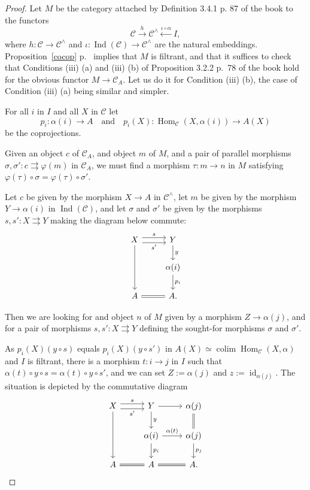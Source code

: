 \documentclass[12pt]{article}%
\theoremstyle{remark}
\theoremstyle{definition}
\newcommand{\C}{\mathcal C}
\newcommand{\pp}{\varphi}
\newcommand{\parar}{\rightrightarrows}
\DeclareMathOperator*{\colim}{colim}%
\DeclareMathOperator{\id}{id}
\DeclareMathOperator{\Hom}{Hom}%
\DeclareMathOperator{\Ind}{Ind}
\begin{document}
\begin{proof}
Let $M$ be the category attached by Definition 3.4.1 p. 87 of the book to the functors 
$$
\C\xrightarrow h\C^\wedge\xleftarrow{\iota\circ\alpha}I,
$$ 
where $h:\C\to\C^\wedge$ and $\iota:\Ind(\C)\to\C^\wedge$ are the natural embeddings. Proposition~\ref{cocop} p.~\pageref{cocop} implies that $M$ is filtrant, and that it suffices to check that Conditions (iii) (a) and (iii) (b) of Proposition 3.2.2 p.~78 of the book hold for the obvious functor $M\to\C_A$. Let us do it for Condition (iii) (b), the case of Condition (iii) (a) being similar and simpler. 

For all $i$ in $I$ and all $X$ in $\C$ let 
$$
p_i:\alpha(i)\to A\quad\text{and}\quad p_i(X):\Hom_\C(X,\alpha(i))\to A(X)
$$
be the coprojections.

Given an object $c$ of $\C_A$, and object $m$ of $M$, and a pair of parallel morphisms $\sigma,\sigma':c\parar\pp(m)$ in $\C_A$, we must find a morphism $\tau:m\to n$ in $M$ satisfying $\pp(\tau)\circ\sigma=\pp(\tau)\circ\sigma'$. 

Let $c$ be given by the morphism $X\to A$ in $\C^\wedge$, let $m$ be given by the morphism $Y\to\alpha(i)$ in $\Ind(\C)$, and let $\sigma$ and $\sigma'$ be given by the morphisms $s,s':X\parar Y$ making the diagram below commute:
$$
\begin{tikzcd}
X\ar{dd}\ar[yshift=0.7ex]{r}{s}\ar[yshift=-0.7ex]{r}[swap]{s'}&Y\ar{d}{y}\\ 
{}&\alpha(i)\ar{d}{p_i}\\ 
A\ar[equal]{r}&A.
\end{tikzcd}
$$ 

Then we are looking for and object $n$ of $M$ given by a morphism $Z\to\alpha(j)$, and for a pair of morphisms $s,s':X\parar Y$ defining the sought-for morphisms $\sigma$ and $\sigma'$. 

As $p_i(X)(y\circ s)$ equals $p_i(X)(y\circ s')$ in $A(X)\simeq\colim\Hom_\C(X,\alpha)$ and $I$ is filtrant, there is a morphism $t:i\to j$ in $I$ such that $\alpha(t)\circ y\circ s=\alpha(t)\circ y\circ s'$, and we can set $Z:=\alpha(j)$ and $z:=\id_{\alpha(j)}$. The situation is depicted by the commutative diagram
$$
\begin{tikzcd}
X\ar{dd}\ar[yshift=0.7ex]{r}{s}\ar[yshift=-0.7ex]{r}[swap]{s'}&Y\ar{d}{y}\ar{r}&\alpha(j)\ar[equal]{d}\\ 
{}&\alpha(i)\ar{d}{p_i}\ar{r}{\alpha(t)}&\alpha(j)\ar{d}{p_j}\\ 
A\ar[equal]{r}&A\ar[equal]{r}&A.
\end{tikzcd}
$$
\end{proof}
\end{document}
